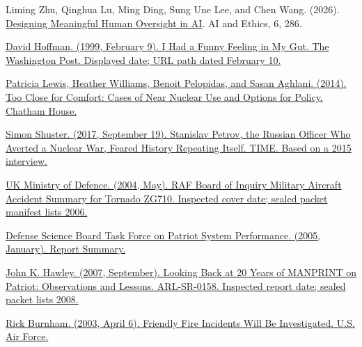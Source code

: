 \documentclass[11pt]{article}
\newenvironment{TAEReferences}{%
  \begin{list}{}{%
    \renewcommand{\makelabel}[1]{}%
    \setlength{\labelwidth}{0pt}%
    \setlength{\labelsep}{0pt}%
    \setlength{\leftmargin}{0.5in}%
    \setlength{\itemindent}{-0.5in}%
    \setlength{\itemsep}{0.45em}%
    \setlength{\parsep}{0pt}%
    \setlength{\topsep}{0.25em}%
  }%
}{\end{list}}
\begin{document}
\begin{TAEReferences}
\item{}\label{reference-50} Liming Zhu, Qinghua Lu, Ming Ding, Sung Une Lee, and Chen Wang. (2026). \href{https://doi.org/10.1007/s43681-026-01147-7}{Designing Meaningful Human Oversight in AI}. AI and Ethics, 6, 286.
\item{}\label{reference-51} \href{https://www.washingtonpost.com/archive/politics/1999/02/10/i-had-a-funny-feeling-in-my-gut/97fb4af6-2a54-4805-8ec0-115a13f33493/}{David Hoffman. (1999, February 9). I Had a Funny Feeling in My Gut. The Washington Post. Displayed date; URL path dated February 10.}
\item{}\label{reference-52} \href{https://www.chathamhouse.org/sites/default/files/field/field_document/20140428TooCloseforComfortNuclearUseLewisWilliamsPelopidasAghlani.pdf}{Patricia Lewis, Heather Williams, Benoit Pelopidas, and Sasan Aghlani. (2014). Too Close for Comfort: Cases of Near Nuclear Use and Options for Policy. Chatham House.}
\item{}\label{reference-53} \href{https://time.com/4947879/stanislav-petrov-russia-nuclear-war-obituary/}{Simon Shuster. (2017, September 19). Stanislav Petrov, the Russian Officer Who Averted a Nuclear War, Feared History Repeating Itself. TIME. Based on a 2015 interview.}
\item{}\label{reference-54} \href{https://assets.publishing.service.gov.uk/media/5a78e39b40f0b62b22cbd9a5/maas03_02_tornado_zg710_22mar03.pdf}{UK Ministry of Defence. (2004, May). RAF Board of Inquiry Military Aircraft Accident Summary for Tornado ZG710. Inspected cover date; sealed packet manifest lists 2006.}
\item{}\label{reference-55} \href{https://www.govinfo.gov/content/pkg/GOVPUB-D-PURL-LPS66633/pdf/GOVPUB-D-PURL-LPS66633.pdf}{Defense Science Board Task Force on Patriot System Performance. (2005, January). Report Summary.}
\item{}\label{reference-56} \href{https://www.govinfo.gov/content/pkg/GOVPUB-D101-PURL-gpo58824/pdf/GOVPUB-D101-PURL-gpo58824.pdf}{John K. Hawley. (2007, September). Looking Back at 20 Years of MANPRINT on Patriot: Observations and Lessons. ARL-SR-0158. Inspected report date; sealed packet lists 2008.}
\item{}\label{reference-57} \href{https://www.af.mil/News/Article-Display/Article/139557/friendly-fire-incidents-will-be-investigated/}{Rick Burnham. (2003, April 6). Friendly Fire Incidents Will Be Investigated. U.S. Air Force.}

\end{TAEReferences}
\end{document}
